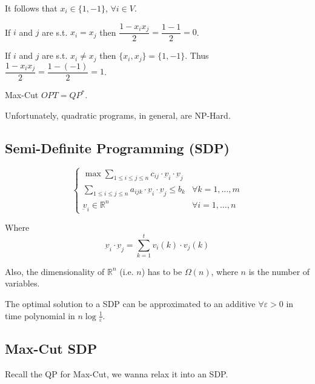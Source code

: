     It follows that $x_i \in \{1,-1\}$, $\forall i \in V$.

    If $i$ and $j$ are s.t. $x_i = x_j$ then $\dfrac{1- x_i x_j}{2} = \dfrac{1 - 1}{2} = 0$.

    If $i$ and $j$ are s.t. $x_i \neq x_j$ then $\{x_i,x_j\} = \{1,-1\}$. Thus $\dfrac{1- x_i x_j}{2} = \dfrac{1 - (-1)}{2} = 1$.

    \begin{lemma}
        Max-Cut $OPT = QP^*$.
    \end{lemma}

    Unfortunately, quadratic programs, in general, are NP-Hard.


\subsection{Semi-Definite Programming (SDP)}

    \begin{equation}
        \begin{cases}
            \max \sum_{1 \leq i \leq j \leq n} c_{ij} \cdot \underbar{v}_i \cdot \underbar{v}_j\\
            \sum_{1 \leq i \leq j \leq n} a_{ijk} \cdot \underbar{v}_i \cdot \underbar{v}_j \leq b_k & \forall k = 1, \dots, m\\
            \underbar{v}_i \in \mathbb{R}^n & \forall i = 1, \dots, n
        \end{cases}
    \end{equation}

    Where
    \[ \underbar{v}_i \cdot \underbar{v}_j = \sum_{k=1}^t v_i(k) \cdot v_j(k) \]

    Also, the dimensionality of $\mathbb{R}^n$ (i.e. $n$) has to be $\Omega(n)$, where $n$ is the number of variables.

    The optimal solution to a SDP can be approximated to an additive $\forall \varepsilon > 0$ in time polynomial in $n \log \frac{1}{\varepsilon}$.


\subsection{Max-Cut SDP}
    Recall the QP for Max-Cut, we wanna relax it into an SDP.

